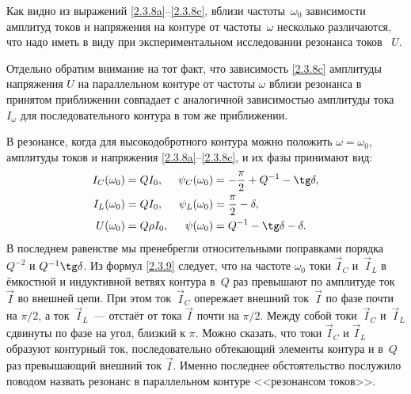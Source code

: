 Как видно из выражений \eqref{2.3.8a}--\eqref{2.3.8c}, 
вблизи частоты~$\omega_0$ зависимости амплитуд токов и напряжения на контуре 
от частоты~$\omega$ несколько различаются, что надо иметь в виду при экспериментальном 
исследовании резонанса токов ~$U.$

Отдельно обратим внимание на тот факт, что зависимость \eqref{2.3.8c} амплитуды
напряжения $U$ на параллельном контуре от частоты $\omega$ вблизи резонанса в
принятом приближении совпадает с аналогичной зависимостью 
амплитуды тока $I_{\omega}$ для последовательного контура в том же приближении.

В резонансе, когда для высокодобротного контура можно положить
$\omega=\omega_0$, амплитуды токов и напряжения \eqref{2.3.8a}--\eqref{2.3.8c},
и их фазы 
принимают вид:
\begin{equation}
	\eqmark{2.3.9}
    \begin{aligned}
			 I_C(\omega_0) & = QI_0, & 
                 \psi_C(\omega_0) & = -\dfrac{\pi}{2}+Q^{-1}-\tg\delta, \\
			 I_L(\omega_0) & = QI_0, & \psi_L(\omega_0) & =
                 \dfrac{\pi}{2}-\delta, \\
			U(\omega_0) &= Q\rho I_0, & \psi(\omega_0) & = 
                    Q^{-1}-\tg\delta-\delta.
    \end{aligned}
\end{equation}
В последнем равенстве мы пренебрегли относительными поправками порядка $Q^{-2}$
и $Q^{-1}\tg\delta$. Из формул \eqref{2.3.9} следует, что на частоте $\omega_0$
токи $\vec{I}_{\! C}$ и~$\vec{I}_{\! L}$ в ёмкостной и индуктивной ветвях контура в~$Q$ раз
превышают по амплитуде ток~$\vec{I}$ во внешней цепи. При этом ток~$\vec{I}_{\! C}$
опережает внешний ток~$\vec{I}$ по фазе почти на $\pi/2$, 
а ток~$\vec{I}_{\! L}$~--- отстаёт от тока $\vec{I}$ почти на $\pi/2$. 
Между собой токи~$\vec{I}_{\! C}$ и~$\vec{I}_{\! L}$ сдвинуты по фазе на угол, 
близкий к  $\pi.$ Можно сказать, что токи $\vec{I}_{\! C}$ и $\vec{I}_{\! L}$ 
образуют контурный ток, последовательно обтекающий элементы контура и 
в~$Q$ раз превышающий внешний ток $\vec{I}$. Именно
последнее обстоятельство послужило поводом назвать резонанс в 
параллельном контуре <<резонансом токов>>.

